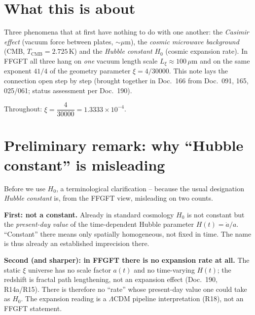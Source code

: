 

\section*{What this is about}

Three phenomena that at first have nothing to do with one another: the
\emph{Casimir effect} (vacuum force between plates, $\sim\mu$m), the
\emph{cosmic microwave background} (CMB, $T_\text{CMB}=2.725$\,K) and the
\emph{Hubble constant} $H_0$ (cosmic expansion rate). In FFGFT all three hang
on \emph{one} vacuum length scale $L_\xi\approx100\,\mu$m and on the same
exponent $41/4$ of the geometry parameter $\xi=4/30000$. This note lays the
connection open step by step (brought together in Doc.~166 from Doc.~091, 165,
025/061; status assessment per Doc.~190).

\medskip
Throughout: $\xi = \dfrac{4}{30000} = 1.3333\times10^{-4}$.

\section{Preliminary remark: why \enquote{Hubble constant} is misleading}

Before we use $H_0$, a terminological clarification -- because the usual
designation \emph{Hubble constant} is, from the FFGFT view, misleading on two
counts.

\textbf{First: not a constant.} Already in standard cosmology $H_0$ is not
constant but the \emph{present-day value} of the time-dependent Hubble
parameter $H(t)=\dot a/a$. \enquote{Constant} there means only spatially
homogeneous, not fixed in time. The name is thus already an established
imprecision there.

\textbf{Second (and sharper): in FFGFT there is no expansion rate at all.}
The static $\xi$ universe has no scale factor $a(t)$ and no time-varying
$H(t)$; the redshift is fractal path lengthening, not an expansion effect
(Doc.~190, R14a/R15). There is therefore no \enquote{rate} whose present-day
value one could take as $H_0$. The expansion reading is a $\Lambda$CDM pipeline
interpretation (R18), not an FFGFT statement.

